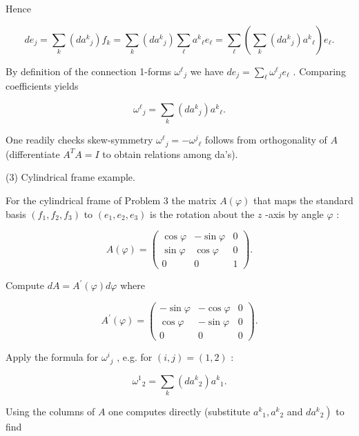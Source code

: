 \documentclass[10pt]{article}
\begin{document}
Hence

\[
d{e}_{j} = \mathop{\sum }\limits_{k}\left( {d{a}^{k}{}_{j}}\right) {f}_{k} = \mathop{\sum }\limits_{k}\left( {d{a}^{k}{}_{j}}\right) \mathop{\sum }\limits_{\ell }{a}^{k}{}_{\ell }{e}_{\ell } = \mathop{\sum }\limits_{\ell }\left( {\mathop{\sum }\limits_{k}\left( {d{a}^{k}{}_{j}}\right) {a}^{k}{}_{\ell }}\right) {e}_{\ell }.
\]

By definition of the connection 1-forms \({\omega }^{\ell }{}_{j}\) we have \(d{e}_{j} = \mathop{\sum }\limits_{\ell }{\omega }^{\ell }{}_{j}{e}_{\ell }\) . Comparing coefficients yields

\[
{\omega }^{\ell }{}_{j} = \mathop{\sum }\limits_{k}\left( {d{a}^{k}{}_{j}}\right) {a}^{k}{}_{\ell }.
\]

One readily checks skew-symmetry \({\omega }^{\ell }{}_{j} =  - {\omega }^{j}{}_{\ell }\) follows from orthogonality of \(A\) (differentiate \({A}^{T}A = I\) to obtain relations among da's).

(3) Cylindrical frame example.

For the cylindrical frame of Problem 3 the matrix \(A\left( \varphi \right)\) that maps the standard basis \(\left( {{f}_{1},{f}_{2},{f}_{3}}\right)\) to \(\left( {{e}_{1},{e}_{2},{e}_{3}}\right)\) is the rotation about the \(z\) -axis by angle \(\varphi\) :

\[
A\left( \varphi \right)  = \left( \begin{matrix} \cos \varphi &  - \sin \varphi & 0 \\  \sin \varphi & \cos \varphi & 0 \\  0 & 0 & 1 \end{matrix}\right) .
\]

Compute \({dA} = {A}^{\prime }\left( \varphi \right) {d\varphi }\) where

\[
{A}^{\prime }\left( \varphi \right)  = \left( \begin{matrix}  - \sin \varphi &  - \cos \varphi & 0 \\  \cos \varphi &  - \sin \varphi & 0 \\  0 & 0 & 0 \end{matrix}\right) .
\]

Apply the formula for \({\omega }^{i}{}_{j}\) , e.g. for \(\left( {i,j}\right)  = \left( {1,2}\right)\) :

\[
{\omega }^{1}{}_{2} = \mathop{\sum }\limits_{k}\left( {d{a}^{k}{}_{2}}\right) {a}^{k}{}_{1}.
\]

Using the columns of \(A\) one computes directly (substitute \({a}^{k}{}_{1},{a}^{k}{}_{2}\) and \(\left. {d{a}^{k}{}_{2}}\right)\) to find
\end{document}

